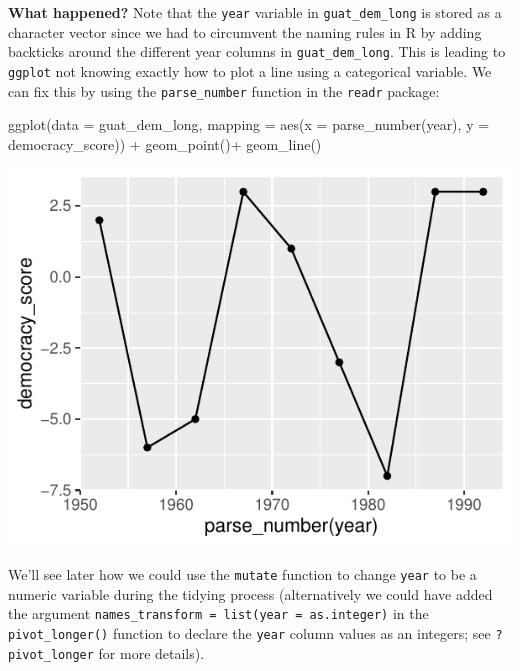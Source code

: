 \documentclass[
  letterpaper,
  DIV=11,
  numbers=noendperiod]{scrartcl}
\newenvironment{Shaded}{\begin{snugshade}}{\end{snugshade}}
\newcommand{\AttributeTok}[1]{\textcolor[rgb]{0.40,0.45,0.13}{#1}}
\newcommand{\FunctionTok}[1]{\textcolor[rgb]{0.28,0.35,0.67}{#1}}
\newcommand{\NormalTok}[1]{\textcolor[rgb]{0.00,0.23,0.31}{#1}}
\newcommand{\SpecialCharTok}[1]{\textcolor[rgb]{0.37,0.37,0.37}{#1}}
\begin{document}
\textbf{What happened?} Note that the \texttt{year} variable in
\texttt{guat\_dem\_long} is stored as a character vector since we had to
circumvent the naming rules in R by adding backticks around the
different year columns in \texttt{guat\_dem\_long}. This is leading to
\texttt{ggplot} not knowing exactly how to plot a line using a
categorical variable. We can fix this by using the
\texttt{parse\_number} function in the \texttt{readr} package:

\begin{Shaded}
\begin{Highlighting}[]
\FunctionTok{ggplot}\NormalTok{(}\AttributeTok{data =}\NormalTok{ guat\_dem\_long, }\AttributeTok{mapping =} \FunctionTok{aes}\NormalTok{(}\AttributeTok{x =} \FunctionTok{parse\_number}\NormalTok{(year), }\AttributeTok{y =}\NormalTok{ democracy\_score)) }\SpecialCharTok{+}
   \FunctionTok{geom\_point}\NormalTok{()}\SpecialCharTok{+}
   \FunctionTok{geom\_line}\NormalTok{()}
\end{Highlighting}
\end{Shaded}

\begin{center}
\includegraphics{notes_files/figure-pdf/unnamed-chunk-16-1.pdf}
\end{center}

We'll see later how we could use the \texttt{mutate} function to change
\texttt{year} to be a numeric variable during the tidying process
(alternatively we could have added the argument
\texttt{names\_transform\ =\ list(year\ =\ as.integer)} in the
\texttt{pivot\_longer()} function to declare the \texttt{year} column
values as an integers; see \texttt{?pivot\_longer} for more details).
\end{document}
